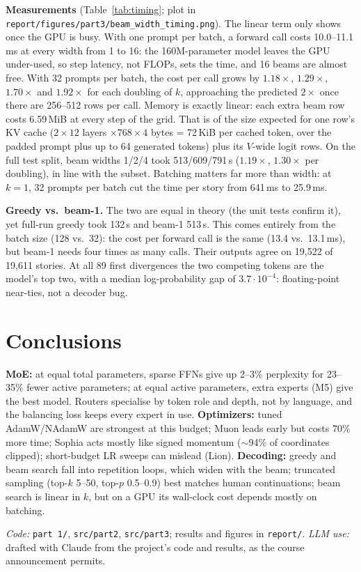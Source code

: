 \documentclass[11pt,a4paper]{article}
\begin{document}
\textbf{Measurements} (Table~\ref{tab:timing}; plot in \texttt{report/figures/part3/beam\_width\_timing.png}). The linear term only shows once the GPU is busy. With one prompt per batch, a forward call costs 10.0--11.1\,ms at every width from 1 to 16: the 160M-parameter model leaves the GPU under-used, so step latency, not FLOPs, sets the time, and 16 beams are almost free. With 32 prompts per batch, the cost per call grows by $1.18\times$, $1.29\times$, $1.70\times$ and $1.92\times$ for each doubling of $k$, approaching the predicted $2\times$ once there are 256--512 rows per call. Memory is exactly linear: each extra beam row costs 6.59\,MiB at every step of the grid. That is of the size expected for one row's KV cache ($2\times12$ layers $\times768\times4$ bytes = 72\,KiB per cached token, over the padded prompt plus up to 64 generated tokens) plus its $V$-wide logit rows. On the full test split, beam widths 1/2/4 took 513/609/791\,s ($1.19\times$, $1.30\times$ per doubling), in line with the subset. Batching matters far more than width: at $k=1$, 32 prompts per batch cut the time per story from 641\,ms to 25.9\,ms.

\textbf{Greedy vs.\ beam-1.} The two are equal in theory (the unit tests confirm it), yet full-run greedy took 132\,s and beam-1 513\,s. This comes entirely from the batch size (128 vs.\ 32): the cost per forward call is the same (13.4 vs.\ 13.1\,ms), but beam-1 needs four times as many calls. Their outputs agree on 19,522 of 19,611 stories. At all 89 first divergences the two competing tokens are the model's top two, with a median log-probability gap of $3.7\cdot10^{-4}$: floating-point near-ties, not a decoder bug.

\section{Conclusions}
\textbf{MoE:} at equal total parameters, sparse FFNs give up 2--3\% perplexity for 23--35\% fewer active parameters; at equal active parameters, extra experts (M5) give the best model. Routers specialise by token role and depth, not by language, and the balancing loss keeps every expert in use. \textbf{Optimizers:} tuned AdamW/NAdamW are strongest at this budget; Muon leads early but costs 70\% more time; Sophia acts mostly like signed momentum ($\sim$94\% of coordinates clipped); short-budget LR sweeps can mislead (Lion). \textbf{Decoding:} greedy and beam search fall into repetition loops, which widen with the beam; truncated sampling (top-$k$ 5--50, top-$p$ 0.5--0.9) best matches human continuations; beam search is linear in $k$, but on a GPU its wall-clock cost depends mostly on batching.

\noindent\textit{Code:} \texttt{part 1/}, \texttt{src/part2}, \texttt{src/part3}; results and figures in \texttt{report/}. \textit{LLM use:} drafted with Claude from the project's code and results, as the course announcement permits.
\end{document}
